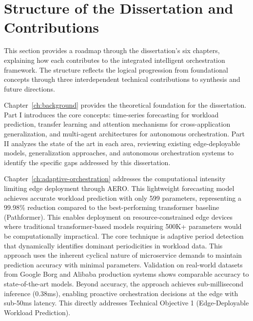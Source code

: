 \section{Structure of the Dissertation and Contributions}
\label{sec:ch1_dissertation_structure}

This section provides a roadmap through the dissertation's six chapters, explaining how each contributes to the integrated intelligent orchestration framework. The structure reflects the logical progression from foundational concepts through three interdependent technical contributions to synthesis and future directions.

Chapter~\ref{ch:background} provides the theoretical foundation for the dissertation. Part I introduces the core concepts: time-series forecasting for workload prediction, transfer learning and attention mechanisms for cross-application generalization, and multi-agent architectures for autonomous orchestration. Part II analyzes the state of the art in each area, reviewing existing edge-deployable models, generalization approaches, and autonomous orchestration systems to identify the specific gaps addressed by this dissertation.

Chapter~\ref{ch:adaptive-orchestration} addresses the computational intensity limiting edge deployment through \ac{AERO}. This lightweight forecasting model achieves accurate workload prediction with only 599 parameters, representing a 99.98\% reduction compared to the best-performing transformer baseline (Pathformer). This enables deployment on resource-constrained edge devices where traditional transformer-based models requiring 500K+ parameters would be computationally impractical. The core technique is adaptive period detection that dynamically identifies dominant periodicities in workload data. This approach uses the inherent cyclical nature of microservice demands to maintain prediction accuracy with minimal parameters. Validation on real-world datasets from Google Borg and Alibaba production systems shows comparable accuracy to state-of-the-art models. Beyond accuracy, the approach achieves sub-millisecond inference (0.38ms), enabling proactive orchestration decisions at the edge with sub-50ms latency. This directly addresses Technical Objective 1 (Edge-Deployable Workload Prediction).

